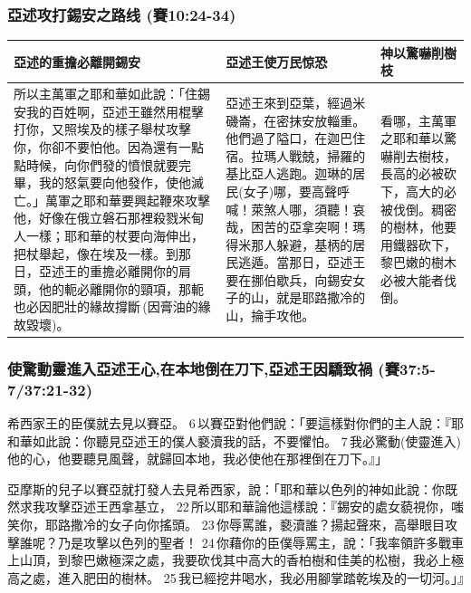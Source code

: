 \subsubsection{亞述攻打錫安之路线 (賽10:24-34)}
\begin{table}[H]
\centering 
\begin{tabular}{p{8.5cm}|p{5.75cm}|p{2.75cm}}\hline\hline
亞述的重擔必離開錫安&亞述王使万民惊恐&神以驚嚇削樹枝\\\hline
所以主萬軍之耶和華如此說：「住錫安我的百姓啊，亞述王雖然用棍擊打你，又照埃及的樣子舉杖攻擊你，你卻不要怕他。因為還有一點點時候，向你們發的憤恨就要完畢，我的怒氣要向他發作，使他滅亡。」萬軍之耶和華要興起鞭來攻擊他，好像在俄立磐石那裡殺戮米甸人一樣；耶和華的杖要向海伸出，把杖舉起，像在埃及一樣。到那日，亞述王的重擔必離開你的肩頭，他的軛必離開你的頸項，那軛也必因肥壯的緣故撐斷 (因膏油的緣故毀壞)。
&亞述王來到亞葉，經過米磯崙，在密抹安放輜重。他們過了隘口，在迦巴住宿。拉瑪人戰兢，掃羅的基比亞人逃跑。迦琳的居民(女子)哪，要高聲呼喊！萊煞人哪，須聽！哀哉，困苦的亞拿突啊！瑪得米那人躲避，基柄的居民逃遁。當那日，亞述王要在挪伯歇兵，向錫安女子的山，就是耶路撒冷的山，掄手攻他。&看哪，主萬軍之耶和華以驚嚇削去樹枝，長高的必被砍下，高大的必被伐倒。稠密的樹林，他要用鐵器砍下，黎巴嫩的樹木必被大能者伐倒。\\\hline
\end{tabular}
\end{table}



\subsubsection{使驚動靈進入亞述王心,在本地倒在刀下,亞述王因驕致禍 (賽37:5-7/37:21-32)}
希西家王的臣僕就去見以賽亞。 6 以賽亞對他們說：「要這樣對你們的主人說：『耶和華如此說：你聽見亞述王的僕人褻瀆我的話，不要懼怕。 7 我必驚動(使靈進入)他的心，他要聽見風聲，就歸回本地，我必使他在那裡倒在刀下。』」

亞摩斯的兒子以賽亞就打發人去見希西家，說：「耶和華以色列的神如此說：你既然求我攻擊亞述王西拿基立， 22 所以耶和華論他這樣說：『錫安的處女藐視你，嗤笑你，耶路撒冷的女子向你搖頭。 23 你辱罵誰，褻瀆誰？揚起聲來，高舉眼目攻擊誰呢？乃是攻擊以色列的聖者！ 24 你藉你的臣僕辱罵主，說：「我率領許多戰車上山頂，到黎巴嫩極深之處，我要砍伐其中高大的香柏樹和佳美的松樹，我必上極高之處，進入肥田的樹林。 25 我已經挖井喝水，我必用腳掌踏乾埃及的一切河。」』

